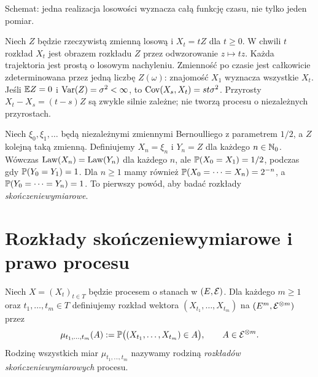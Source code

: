 \begin{center}
\par\smallskip\small Schemat: jedna realizacja losowości wyznacza całą funkcję czasu, nie tylko jeden pomiar.
\end{center}

\begin{przyklad}
Niech $Z$ będzie rzeczywistą zmienną losową i $X_t=tZ$ dla $t\ge0$.
W chwili $t$ rozkład $X_t$ jest obrazem rozkładu $Z$ przez
odwzorowanie $z\mapsto tz$. Każda trajektoria jest prostą o losowym
nachyleniu. Zmienność po czasie jest całkowicie zdeterminowana przez
jedną liczbę $Z(\omega)$: znajomość $X_1$ wyznacza wszystkie $X_t$.
Jeśli $\mathbb{E} Z=0$ i $\operatorname{Var}(Z)=\sigma^2<\infty$, to
$\operatorname{Cov}(X_s,X_t)=st\sigma^2$. Przyrosty
$X_t-X_s=(t-s)Z$ są zwykle silnie zależne; nie tworzą procesu o
niezależnych przyrostach.
\end{przyklad}

\begin{przyklad}
Niech $\xi_0,\xi_1,\ldots$ będą niezależnymi zmiennymi Bernoulliego
z parametrem $1/2$, a $Z$ kolejną taką zmienną. Definiujemy
$X_n=\xi_n$ i $Y_n=Z$ dla każdego $n\in\mathbb{N}_0$.
Wówczas $\operatorname{Law}(X_n)=\operatorname{Law}(Y_n)$ dla każdego $n$, ale
$\mathbb{P}(X_0=X_1)=1/2$, podczas gdy $\mathbb{P}(Y_0=Y_1)=1$.
Dla $n\ge1$ mamy również
$\mathbb{P}(X_0=\cdots=X_n)=2^{-n}$,
a $\mathbb{P}(Y_0=\cdots=Y_n)=1$.
To pierwszy powód, aby badać rozkłady \emph{skończeniewymiarowe}.
\end{przyklad}

\section{Rozkłady skończeniewymiarowe i prawo procesu}
\begin{definicja}
Niech $X=(X_t)_{t\in T}$ będzie procesem o stanach w $(E,\mathcal{E})$.
Dla każdego $m\ge1$ oraz $t_1,\ldots,t_m\in T$ definiujemy
rozkład wektora $(X_{t_1},\ldots,X_{t_m})$ na
$(E^m,\mathcal{E}^{\otimes m})$ przez
\[
\mu_{t_1,\ldots,t_m}(A)
:=\mathbb{P}\big((X_{t_1},\ldots,X_{t_m})\in A\big),
\qquad A\in\mathcal{E}^{\otimes m}.
\]
Rodzinę wszystkich miar $\mu_{t_1,\ldots,t_m}$ nazywamy rodziną
\emph{rozkładów skończeniewymiarowych} procesu.
\end{definicja}

